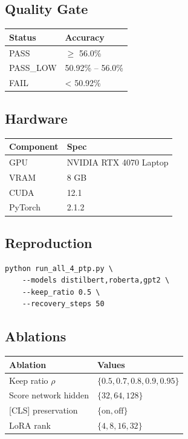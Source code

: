 \subsection{Quality Gate}

\begin{table}[H]
\centering
\small
\begin{tabular}{ll}
\toprule
\textbf{Status} & \textbf{Accuracy} \\
\midrule
PASS & $\ge$ 56.0\% \\
PASS\_LOW & 50.92\% -- 56.0\% \\
FAIL & < 50.92\% \\
\bottomrule
\end{tabular}
\end{table}

\subsection{Hardware}

\begin{table}[H]
\centering
\small
\begin{tabular}{ll}
\toprule
\textbf{Component} & \textbf{Spec} \\
\midrule
GPU & NVIDIA RTX 4070 Laptop \\
VRAM & 8 GB \\
CUDA & 12.1 \\
PyTorch & 2.1.2 \\
\bottomrule
\end{tabular}
\end{table}

\subsection{Reproduction}

\begin{lstlisting}
python run_all_4_ptp.py \
    --models distilbert,roberta,gpt2 \
    --keep_ratio 0.5 \
    --recovery_steps 50
\end{lstlisting}

\subsection{Ablations}

\begin{table}[H]
\centering
\small
\begin{tabular}{ll}
\toprule
\textbf{Ablation} & \textbf{Values} \\
\midrule
Keep ratio $\rho$ & $\{0.5, 0.7, 0.8, 0.9, 0.95\}$ \\
Score network hidden & $\{32, 64, 128\}$ \\
 {[}CLS] preservation & $\{\text{on}, \text{off}\}$ \\
LoRA rank & $\{4, 8, 16, 32\}$ \\
\bottomrule
\end{tabular}
\end{table}




